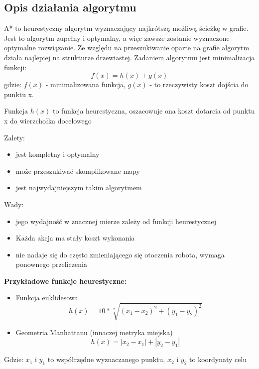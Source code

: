 \subsection{Opis działania algorytmu}

A* to heurestyczny algorytm wyznaczający najkrótszą możliwą ścieżkę w grafie. 
Jest to algorytm zupełny i optymalny, a więc zawsze zostanie wyznaczone optymalne 
rozwiązanie. Ze względu na przeszukiwanie oparte na grafie algorytm działa najlepiej na strukturze drzewiastej.
Zadaniem algorytmu jest minimalizacja funkcji:
\begin{equation}
	f(x)=h(x) + g(x)
	\label{Eq:funkcjaKosztuAStar}
\end{equation}
gdzie: $f(x)$ - minimalizowana funkcja, $g(x)$ - to rzeczywisty koszt dojścia do punktu x.

Funkcja $h(x)$ to funkcja heurestyczna, oszacowuje ona koszt dotarcia od punktu x do wierzchołka docelowego

Zalety:
\begin{itemize}
	\item jest kompletny i optymalny
	\item może przeszukiwać skomplikowane mapy
	\item jest najwydajniejszym takim algorytmem
\end{itemize}
Wady:
\begin{itemize}
	\item jego wydajność w znacznej mierze zależy od funkcji heurestycznej
	\item Każda akcja ma stały koszt wykonania
	\item nie nadaje się do często zmieniającego się otoczenia robota, wymaga ponownego przeliczenia
\end{itemize}


\textbf{Przykładowe funkcje heurestyczne:}
\begin{itemize}
	\item Funkcja euklidesowa
	      \begin{equation}
	      	h(x)= 10 * \sqrt[2]{(x_1 - x_2)^2 + (y_1 - y_2)^2}
	      	\label{Eq:heuresticEucalides}
	      \end{equation}
	\item Geometria Manhattanu (innaczej metryka miejska)
	      \begin{equation}
	      	h(x)= |x_2 - x_1| + |y_2 - y_1|
	      	\label{Eq:heuresticManhattanu}
	      \end{equation}
\end{itemize}
Gdzie: $x_1$ i $y_1$ to współrzędne wyznaczanego punktu, $x_2$ i $y_2$ to koordynaty celu

